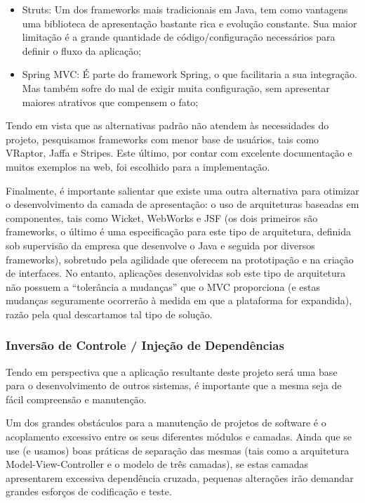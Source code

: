 \documentclass{abnt}
\begin{document}
\begin{itemize}
\item Struts: Um dos frameworks mais tradicionais em Java, tem como vantagens uma biblioteca de apresentação bastante rica e evolução constante. Sua maior limitação é a grande quantidade de código/configuração necessários para definir o fluxo da aplicação;
\item Spring MVC: É parte do framework Spring, o que facilitaria a sua integração. Mas também sofre do mal de exigir muita configuração, sem apresentar maiores atrativos que compensem o fato;
\end{itemize}

Tendo em vista que as alternativas padrão não atendem às necessidades do projeto, pesquisamos frameworks com menor base de usuários, tais como VRaptor, Jaffa e Stripes. Este último, por contar com excelente documentação e muitos exemplos na web, foi escolhido para a implementação.

Finalmente, é importante salientar que existe uma outra alternativa para otimizar o desenvolvimento da camada de apresentação: o uso de arquiteturas baseadas em componentes, tais como Wicket, WebWorks e JSF (os dois primeiros são frameworks, o último é uma especificação para este tipo de arquitetura, definida sob supervisão da empresa que desenvolve o Java e seguida por diversos frameworks), sobretudo pela agilidade que oferecem na prototipação e na criação de interfaces. No entanto, aplicações desenvolvidas sob este tipo de arquitetura não possuem a “tolerância a mudanças” que o MVC proporciona (e estas mudanças seguramente ocorrerão à medida em que a plataforma for expandida), razão pela qual descartamos tal tipo de solução.

\subsubsection{Inversão de Controle / Injeção de Dependências}

Tendo em perspectiva que a aplicação resultante deste projeto será uma base para o desenvolvimento de outros sistemas, é importante que a mesma seja de fácil compreensão e manutenção.

Um dos grandes obstáculos para a manutenção de projetos de software é o acoplamento excessivo entre os seus diferentes módulos e camadas. Ainda que se use (e usamos) boas práticas de separação das mesmas (tais como a arquitetura Model-View-Controller e o modelo de três camadas), se estas camadas apresentarem excessiva dependência cruzada, pequenas alterações irão demandar grandes esforços de codificação e teste.
\end{document}
